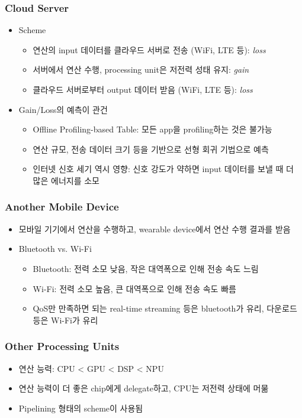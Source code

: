 \subsubsection*{Cloud Server}
\begin{itemize}
    \item Scheme
    \begin{itemize}
        \item 연산의 input 데이터를 클라우드 서버로 전송 (WiFi, LTE 등): \textit{loss}
        \item 서버에서 연산 수행, processing unit은 저전력 성태 유지: \textit{gain}
        \item 클라우드 서버로부터 output 데이터 받음 (WiFi, LTE 등): \textit{loss}
    \end{itemize}
    \newpage
    \item Gain/Loss의 예측이 관건
    \begin{itemize}
        \item Offline Profiling-based Table: 모든 app을 profiling하는 것은 불가능
        \item 연산 규모, 전송 데이터 크기 등을 기반으로 선형 회귀 기법으로 예측
        \item 인터넷 신호 세기 역시 영향: 신호 강도가 약하면 input 데이터를 보낼 때 더 많은 에너지를 소모
    \end{itemize}
\end{itemize}

\subsubsection*{Another Mobile Device}
\begin{itemize}
    \item 모바일 기기에서 연산을 수행하고, wearable device에서 연산 수행 결과를 받음
    \item Bluetooth vs. Wi-Fi
    \begin{itemize}
        \item Bluetooth: 전력 소모 낮음, 작은 대역폭으로 인해 전송 속도 느림
        \item Wi-Fi: 전력 소모 높음, 큰 대역폭으로 인해 전송 속도 빠름
        \item QoS만 만족하면 되는 real-time streaming 등은 bluetooth가 유리, 다운로드 등은 Wi-Fi가 유리
    \end{itemize}
\end{itemize}

\subsubsection*{Other Processing Units}
\begin{itemize}
    \item 연산 능력: CPU < GPU < DSP < NPU
    \item 연산 능력이 더 좋은 chip에게 delegate하고, CPU는 저전력 상태에 머묾
    \item Pipelining 형태의 scheme이 사용됨
\end{itemize}

